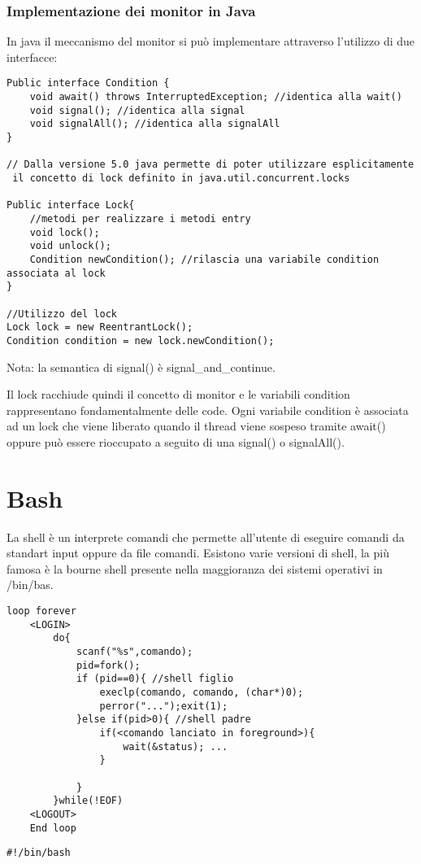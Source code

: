 \documentclass{article}
\begin{document}
\subsubsection{Implementazione dei monitor in Java} 
In java il meccanismo del monitor si può implementare attraverso l'utilizzo di due interfacce:

\begin{lstlisting}[style=CStyle]
Public interface Condition {
    void await() throws InterruptedException; //identica alla wait()
    void signal(); //identica alla signal
    void signalAll(); //identica alla signalAll
}

// Dalla versione 5.0 java permette di poter utilizzare esplicitamente
 il concetto di lock definito in java.util.concurrent.locks

Public interface Lock{
    //metodi per realizzare i metodi entry
    void lock();
    void unlock();
    Condition newCondition(); //rilascia una variabile condition associata al lock
}

//Utilizzo del lock
Lock lock = new ReentrantLock();
Condition condition = new lock.newCondition();

\end{lstlisting}
\noindent Nota: la semantica di signal() è signal\_and\_continue.

\noindent Il lock racchiude quindi il concetto di monitor e le variabili condition rappresentano fondamentalmente delle code.
 Ogni variabile condition è associata ad un lock che viene liberato quando il thread viene sospeso tramite await() oppure 
può essere rioccupato a seguito di una signal() o signalAll().




\pagebreak
\section{Bash}
La shell è un interprete comandi che permette all'utente di eseguire comandi da standart input oppure da file comandi.
Esistono varie versioni di shell, la più famosa è la bourne shell presente nella maggioranza dei sistemi operativi in /bin/bas.
\begin{lstlisting}[style=CStyle]
    loop forever
    <LOGIN>
        do{
            scanf("%s",comando);
            pid=fork();
            if (pid==0){ //shell figlio
                execlp(comando, comando, (char*)0);
                perror("...");exit(1);
            }else if(pid>0){ //shell padre
                if(<comando lanciato in foreground>){
                    wait(&status); ...
                }

            }
        }while(!EOF)
    <LOGOUT>
    End loop 
\end{lstlisting}


\begin{lstlisting}[style=BashStyle]
    #!/bin/bash    
\end{lstlisting}
\end{document}
